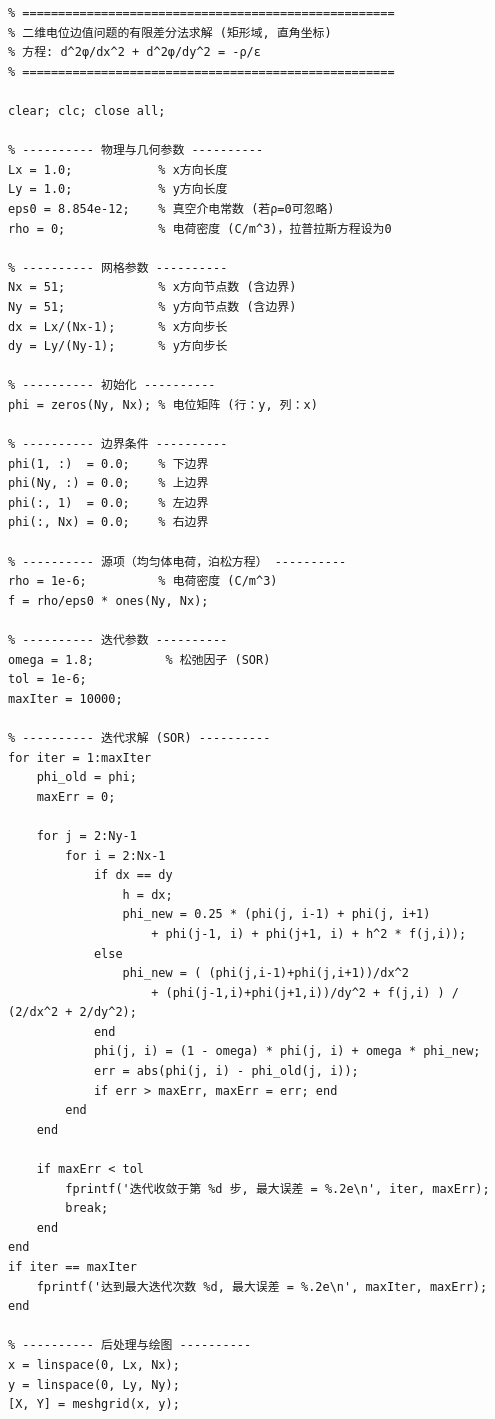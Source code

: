 \documentclass{../ElectromagneticFieldTemplate}
\begin{document}
\begin{verbatim}
% ====================================================
% 二维电位边值问题的有限差分法求解 (矩形域, 直角坐标)
% 方程: d^2φ/dx^2 + d^2φ/dy^2 = -ρ/ε
% ====================================================

clear; clc; close all;

% ---------- 物理与几何参数 ----------
Lx = 1.0;            % x方向长度
Ly = 1.0;            % y方向长度
eps0 = 8.854e-12;    % 真空介电常数 (若ρ=0可忽略)
rho = 0;             % 电荷密度 (C/m^3)，拉普拉斯方程设为0

% ---------- 网格参数 ----------
Nx = 51;             % x方向节点数 (含边界)
Ny = 51;             % y方向节点数 (含边界)
dx = Lx/(Nx-1);      % x方向步长
dy = Ly/(Ny-1);      % y方向步长

% ---------- 初始化 ----------
phi = zeros(Ny, Nx); % 电位矩阵 (行：y, 列：x)

% ---------- 边界条件 ----------
phi(1, :)  = 0.0;    % 下边界
phi(Ny, :) = 0.0;    % 上边界
phi(:, 1)  = 0.0;    % 左边界
phi(:, Nx) = 0.0;    % 右边界

% ---------- 源项（均匀体电荷，泊松方程） ----------
rho = 1e-6;          % 电荷密度 (C/m^3)
f = rho/eps0 * ones(Ny, Nx);

% ---------- 迭代参数 ----------
omega = 1.8;          % 松弛因子 (SOR)
tol = 1e-6;
maxIter = 10000;

% ---------- 迭代求解 (SOR) ----------
for iter = 1:maxIter
    phi_old = phi;
    maxErr = 0;

    for j = 2:Ny-1
        for i = 2:Nx-1
            if dx == dy
                h = dx;
                phi_new = 0.25 * (phi(j, i-1) + phi(j, i+1) 
                    + phi(j-1, i) + phi(j+1, i) + h^2 * f(j,i));
            else
                phi_new = ( (phi(j,i-1)+phi(j,i+1))/dx^2 
                    + (phi(j-1,i)+phi(j+1,i))/dy^2 + f(j,i) ) / (2/dx^2 + 2/dy^2);
            end
            phi(j, i) = (1 - omega) * phi(j, i) + omega * phi_new;
            err = abs(phi(j, i) - phi_old(j, i));
            if err > maxErr, maxErr = err; end
        end
    end

    if maxErr < tol
        fprintf('迭代收敛于第 %d 步, 最大误差 = %.2e\n', iter, maxErr);
        break;
    end
end
if iter == maxIter
    fprintf('达到最大迭代次数 %d, 最大误差 = %.2e\n', maxIter, maxErr);
end

% ---------- 后处理与绘图 ----------
x = linspace(0, Lx, Nx);
y = linspace(0, Ly, Ny);
[X, Y] = meshgrid(x, y);


\end{verbatim}
\end{document}
